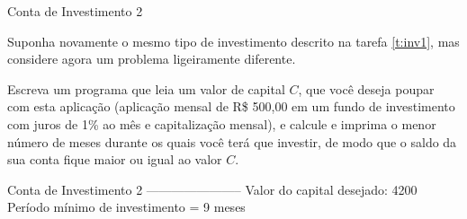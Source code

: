 \documentclass[11pt]{practice}
\begin{document}
\begin{task}[breakable]{Conta de Investimento 2}{}

  Suponha novamente o mesmo tipo de investimento descrito na tarefa
  \ref{t:inv1}, mas considere agora um problema ligeiramente
  diferente.

  Escreva um programa que leia um valor de capital $C$, que você deseja
  poupar com esta aplicação (aplicação mensal de R\$ 500,00 em um fundo
  de investimento com juros de 1\% ao mês e capitalização mensal), e
  calcule e imprima o menor número de meses durante os quais você terá
  que investir, de modo que o saldo da sua conta fique maior ou igual ao
  valor $C$.

  \begin{runexample}
Conta de Investimento 2
-----------------------
Valor do capital desejado: 4200
Período mínimo de investimento = 9 meses
  \end{runexample}

  \tcblower
  \solution
\end{task}
\end{document}
